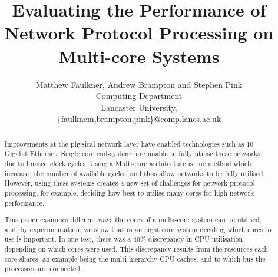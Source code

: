 \documentclass[conference, compsoc]{IEEEtran}
\begin{document}
\title{Evaluating the Performance of Network Protocol Processing on Multi-core Systems}

%

\author{Matthew Faulkner, Andrew Brampton and Stephen Pink\\
Computing Department\\ Lancaster University,\\
 \{faulknem,brampton,pink\}@comp.lancs.ac.uk\\
}

\maketitle
\begin{abstract} %

Improvements at the physical network layer have enabled technologies such as 10 Gigabit Ethernet. Single core end-systems are unable to fully utilise these networks, due to limited clock cycles. Using a Multi-core architecture is one method which increases the number of available cycles, and thus allow networks to be fully utilised. However, using these systems creates a new set of challenges for network protocol processing, for example, deciding how best to utilise many cores for high network performance.

This paper examines different ways the cores of a multi-core system can be utilised, and, by experimentation, we show that in an eight core system deciding which cores to use is important. In one test, there was a 40\% discrepancy in CPU utilisation depending on which cores were used. This discrepancy results from the resources each core shares, an example being the multi-hierarchy CPU caches, and to which bus the processors are connected.
\hfill
\end{abstract}
\end{document}
